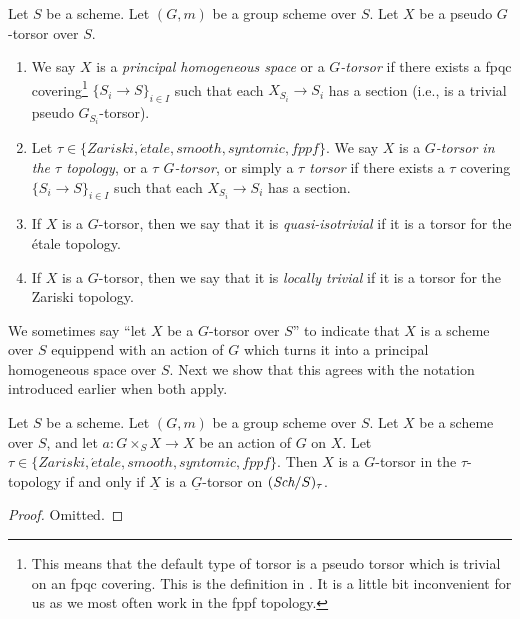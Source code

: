 \begin{definition}
\label{definition-principal-homogeneous-space}
Let $S$ be a scheme.
Let $(G, m)$ be a group scheme over $S$.
Let $X$ be a pseudo $G$-torsor over $S$.
\begin{enumerate}
\item We say $X$ is a {\it principal homogeneous space}
or a {\it $G$-torsor} if there exists a fpqc covering\footnote{This means
that the default type of torsor is a pseudo torsor which is trivial on an
fpqc covering. This is the definition in \cite[Expos\'e IV, 6.5]{SGA3}.
It is a little bit inconvenient for us as we most often work in the fppf
topology.}
$\{S_i \to S\}_{i \in I}$ such that each
$X_{S_i} \to S_i$ has a section (i.e., is a trivial pseudo $G_{S_i}$-torsor).
\item Let $\tau \in \{Zariski, \acute{e}tale, smooth, syntomic, fppf\}$.
We say $X$ is a {\it $G$-torsor in the $\tau$ topology}, or a
{\it $\tau$ $G$-torsor}, or simply a {\it $\tau$ torsor}
if there exists a $\tau$ covering $\{S_i \to S\}_{i \in I}$
such that each $X_{S_i} \to S_i$ has a section.
\item If $X$ is a $G$-torsor, then we say that it is
{\it quasi-isotrivial} if it is a torsor for the \'etale topology.
\item If $X$ is a $G$-torsor, then we say that it is
{\it locally trivial} if it is a torsor for the Zariski topology.
\end{enumerate}
\end{definition}

\noindent
We sometimes say ``let $X$ be a $G$-torsor over $S$'' to indicate that
$X$ is a scheme over $S$ equippend with an action of $G$ which turns it
into a principal homogeneous space over $S$.
Next we show that this agrees with the notation introduced earlier
when both apply.

\begin{lemma}
\label{lemma-torsor}
Let $S$ be a scheme.
Let $(G, m)$ be a group scheme over $S$.
Let $X$ be a scheme over $S$, and let
$a : G \times_S X \to X$ be an action of $G$ on $X$.
Let $\tau \in \{Zariski, \acute{e}tale, smooth, syntomic, fppf\}$.
Then $X$ is a $G$-torsor in the $\tau$-topology if and only if
$\underline{X}$ is a $\underline{G}$-torsor on $(\textit{Sch}/S)_\tau$.
\end{lemma}

\begin{proof}
Omitted.
\end{proof}

